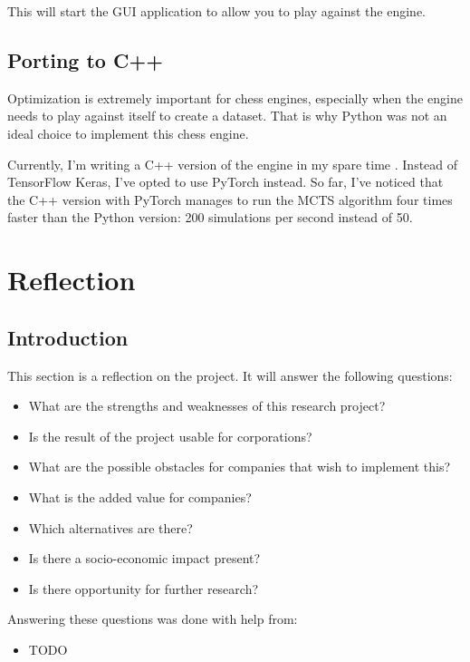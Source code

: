 \documentclass{article}
\begin{document}
This will start the GUI application to allow you to play against the engine. 

\subsection{Porting to C++}

Optimization is extremely important for chess engines, especially when the engine needs to play
against itself to create a dataset. That is why Python was not an ideal choice to implement this chess engine.

Currently, I'm writing a C++ version of the engine in my spare time \cite{zjefferChessdeeprlcpp2022}. Instead of TensorFlow Keras, I've opted to 
use PyTorch instead. So far, I've noticed that the C++ version with PyTorch manages to run the MCTS algorithm 
four times faster than the Python version: 200 simulations per second instead of 50.




\newpage
\section{Reflection}

\subsection{Introduction}

This section is a reflection on the project. It will answer the following questions:

\begin{itemize}
    \item What are the strengths and weaknesses of this research project?
    \item Is the result of the project usable for corporations?
    \item What are the possible obstacles for companies that wish to implement this?
    \item What is the added value for companies?
    \item Which alternatives are there?
    \item Is there a socio-economic impact present?
    \item Is there opportunity for further research?
\end{itemize}

Answering these questions was done with help from:

\begin{itemize}
    \item TODO
\end{itemize}
\end{document}
